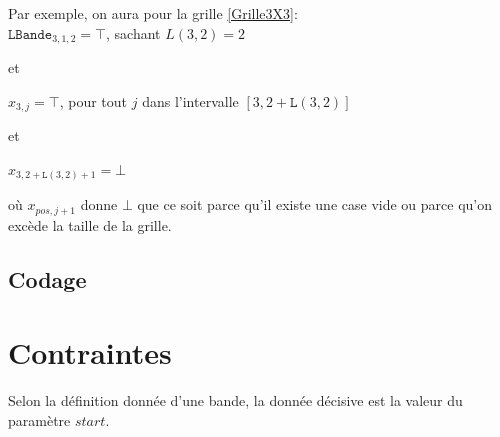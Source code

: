 \documentclass[a4paper,12pt]{report}
\begin{document}
Par exemple, on aura pour la grille \ref{Grille3X3}:\\

$\mathtt{LBande}_{3,1,2} = \top$, sachant $L(3,2) = 2$ 

et

$x_{3,j} = \top$, pour tout $j$ dans l'intervalle $ [3,2+\mathtt{L}(3,2)]$

et

$x_{3,2+\mathtt{L}(3,2)+1} = \bot  $

où $x_{pos,j+1}$ donne $\bot$ que ce soit parce qu'il existe une case vide ou parce qu'on excède la taille de la grille.

\subsection{Codage}

\section{Contraintes}

Selon la définition donnée d'une bande, la donnée décisive est la valeur du paramètre $start$. 
\end{document}
